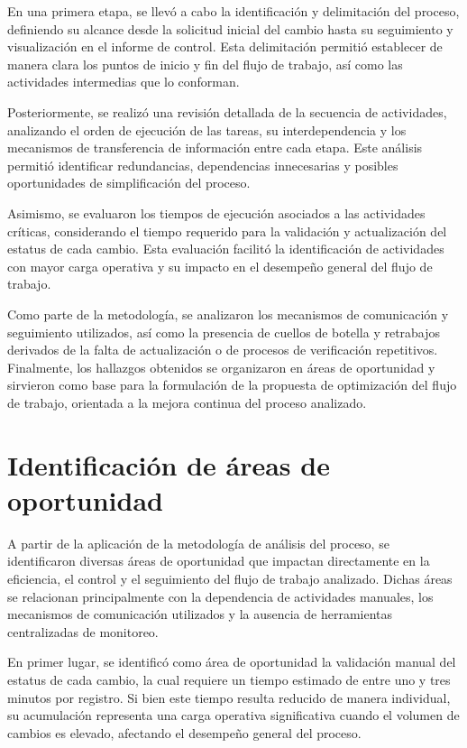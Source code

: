 \documentclass[12pt]{article}
\begin{document}
En una primera etapa, se llevó a cabo la identificación y delimitación del proceso, definiendo su alcance desde la solicitud inicial del cambio hasta su seguimiento y visualización en el informe de control. Esta delimitación permitió establecer de manera clara los puntos de inicio y fin del flujo de trabajo, así como las actividades intermedias que lo conforman.

Posteriormente, se realizó una revisión detallada de la secuencia de actividades, analizando el orden de ejecución de las tareas, su interdependencia y los mecanismos de transferencia de información entre cada etapa. Este análisis permitió identificar redundancias, dependencias innecesarias y posibles oportunidades de simplificación del proceso.

Asimismo, se evaluaron los tiempos de ejecución asociados a las actividades críticas, considerando el tiempo requerido para la validación y actualización del estatus de cada cambio. Esta evaluación facilitó la identificación de actividades con mayor carga operativa y su impacto en el desempeño general del flujo de trabajo.

Como parte de la metodología, se analizaron los mecanismos de comunicación y seguimiento utilizados, así como la presencia de cuellos de botella y retrabajos derivados de la falta de actualización o de procesos de verificación repetitivos. Finalmente, los hallazgos obtenidos se organizaron en áreas de oportunidad y sirvieron como base para la formulación de la propuesta de optimización del flujo de trabajo, orientada a la mejora continua del proceso analizado.


\section*{Identificación de áreas de oportunidad}
A partir de la aplicación de la metodología de análisis del proceso, se identificaron diversas áreas de oportunidad que impactan directamente en la eficiencia, el control y el seguimiento del flujo de trabajo analizado. Dichas áreas se relacionan principalmente con la dependencia de actividades manuales, los mecanismos de comunicación utilizados y la ausencia de herramientas centralizadas de monitoreo.

En primer lugar, se identificó como área de oportunidad la validación manual del estatus de cada cambio, la cual requiere un tiempo estimado de entre uno y tres minutos por registro. Si bien este tiempo resulta reducido de manera individual, su acumulación representa una carga operativa significativa cuando el volumen de cambios es elevado, afectando el desempeño general del proceso.
\end{document}
